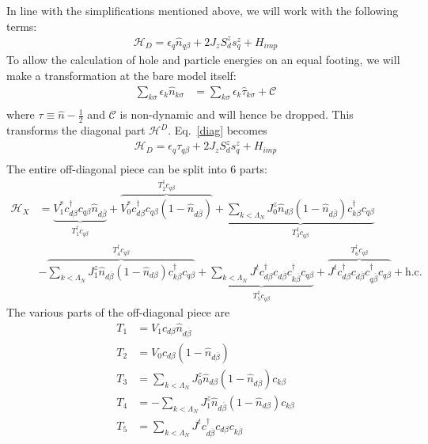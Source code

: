 \documentclass[twoside]{report}
\numberwithin{equation}{section}
\begin{document}
In line with the simplifications mentioned above, we will work with the following terms:
\begin{equation}\begin{aligned}
	\label{diag}
\mathcal{H}_D = \epsilon_q \hat n_{q\beta} + 2J_z S^z_d s^z_q + H_{imp}
\end{aligned}\end{equation}
 To allow the calculation of hole and particle energies on an equal footing, we will make a transformation at the bare model itself:
 \begin{equation}\begin{aligned}
\sum_{k\sigma} \epsilon_k \hat n_{k\sigma} &= \sum_{k\sigma} \epsilon_k \hat \tau_{k\sigma} + \mathcal{C}\\
\end{aligned}\end{equation}
where \(\tau \equiv \hat n - \frac{1}{2}\) and \(\mathcal{C}\) is non-dynamic and will hence be dropped. This transforms the diagonal part \(\mathcal{H}^D\). Eq.~\ref{diag} becomes
\begin{equation}\begin{aligned}
\mathcal{H}_D = \epsilon_q \tau_{q\beta} + 2J_z S^z_d s^z_q  + H_{imp}\\
\end{aligned}\end{equation}
The entire off-diagonal piece can be split into 6 parts:
\begin{equation}\begin{aligned}
	\mathcal{H}_X &= \underbrace{V_1^* c^\dagger_{d\beta}c_{q\beta}\hat n_{d\overline\beta}}_{T^\dagger_1 c_{q\beta}} + \overbrace{V_0^* c^\dagger_{d\beta}c_{q\beta}\left(1 - \hat n_{d\overline\beta}\right)}^{T^\dagger_2 c_{q\beta}} + \underbrace{\sum_{k<\Lambda_N}J^z_0 \hat n_{d\beta}\left(1 - \hat n_{d\overline\beta}\right) c^\dagger_{k\beta}c_{q\beta}}_{T^\dagger_3 c_{q\beta}} \\
	       &- \overbrace{\sum_{k<\Lambda_N}J^z_1 \hat n_{d\overline\beta}\left(1 - \hat n_{d\beta}\right) c^\dagger_{k\beta}c_{q\beta}}^{T^\dagger_4 c_{q\beta}} + \underbrace{\sum_{k<\Lambda_N}J^t c^\dagger_{d\beta}c_{d\overline\beta}c^\dagger_{k\overline\beta}c_{q \beta}}_{T^\dagger_5 c_{q\beta}} + \overbrace{J^t c^\dagger_{d\beta}c_{d\overline\beta}c^\dagger_{q\overline\beta}c_{q \beta}}^{T^\dagger_6 c_{q\beta}} + \text{h.c.}
\end{aligned}\end{equation}
The various parts of the off-diagonal piece are
\begin{equation}\begin{aligned}
	T_1 &= V_1 c_{d\beta}\hat n_{d\overline\beta}\\
	T_2 &= V_0 c_{d\beta}\left(1 - \hat n_{d\overline\beta}\right)\\
	T_3 &= \sum_{k<\Lambda_N}J^z_0 \hat n_{d\beta}\left(1 - \hat n_{d\overline\beta}\right) c_{k\beta}\\
	T_4 &= -\sum_{k<\Lambda_N}J^z_1 \hat n_{d\overline\beta}\left(1 - \hat n_{d\beta}\right) c_{k\beta}\\
	T_5 &= \sum_{k<\Lambda_N}J^t c^\dagger_{d\overline\beta}c_{d\beta}c_{k\overline\beta}
\end{aligned}\end{equation}
\end{document}
